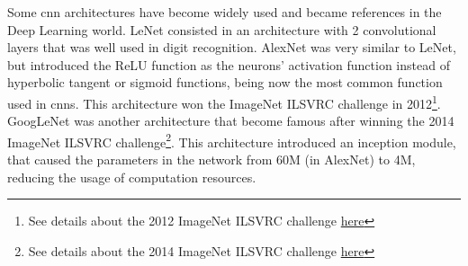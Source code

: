 \documentclass[
  twoside,
  11pt, a4paper,
  footinclude=true,
  headinclude=true,
  cleardoublepage=empty
]{scrbook}
\begin{document}

        Some \gls{cnn} architectures have become widely used and became references in the Deep Learning world. LeNet \cite{lecun1998gradient} consisted in an architecture with 2 convolutional layers that was well used in digit recognition. AlexNet \cite{krizhevsky2012imagenet} was very similar to LeNet, but introduced the ReLU function as the neurons' activation function instead of hyperbolic tangent or sigmoid functions, being now the most common function used in \glspl{cnn}. This architecture won the ImageNet ILSVRC challenge in 2012\footnote{See details about the 2012 ImageNet ILSVRC challenge \href{http://www.image-net.org/challenges/LSVRC/2012/}{here}}.
        GoogLeNet \cite{simonyan2014very} was another architecture that become famous after winning the 2014 ImageNet ILSVRC challenge\footnote{See details about the 2014 ImageNet ILSVRC challenge \href{http://www.image-net.org/challenges/LSVRC/2014/}{here}}. This architecture introduced an inception module, that caused the parameters in the network from $60$M (in AlexNet) to 4M, reducing the usage of computation resources.
\end{document}
